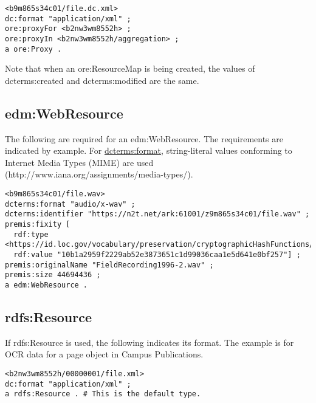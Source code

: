 \documentclass[11pt]{article}
\begin{document}
\begin{verbatim}
<b9m865s34c01/file.dc.xml>
dc:format "application/xml" ;
ore:proxyFor <b2nw3wm8552h> ;
ore:proxyIn <b2nw3wm8552h/aggregation> ;
a ore:Proxy .
\end{verbatim}

Note that when an ore:ResourceMap is being created, the values of dcterms:created and dcterms:modified are the same.

\subsection{edm:WebResource}

The following are required for an edm:WebResource. The requirements are indicated by example. For \underline{dcterms:format}, string-literal values conforming to Internet Media Types (MIME) are used (http://www.iana.org/assignments/media-types/).

\begin{verbatim}
<b9m865s34c01/file.wav> 
dcterms:format "audio/x-wav" ;
dcterms:identifier "https://n2t.net/ark:61001/z9m865s34c01/file.wav" ;
premis:fixity [
  rdf:type <https://id.loc.gov/vocabulary/preservation/cryptographicHashFunctions/sha512>;
  rdf:value "10b1a2959f2229ab52e3873651c1d99036caa1e5d641e0bf257"] ;
premis:originalName "FieldRecording1996-2.wav" ;
premis:size 44694436 ;
a edm:WebResource .
\end{verbatim}

\subsection{rdfs:Resource}

If rdfs:Resource is used, the following indicates its format. The example is for OCR data for a page object in Campus Publications.

\begin{verbatim}
<b2nw3wm8552h/00000001/file.xml>
dc:format "application/xml" ;
a rdfs:Resource . # This is the default type. 
\end{verbatim}


\end{document}
